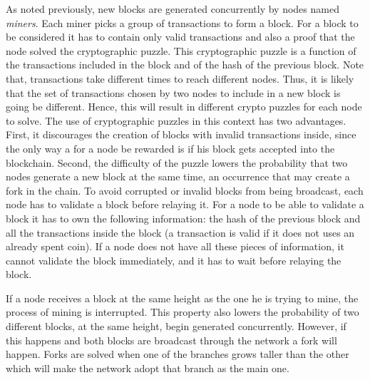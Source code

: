 \documentclass{dads}   %
\begin{document}
As noted previously, new blocks are generated concurrently by nodes named \textsl{miners}. Each miner picks a group of transactions to form a block. For a block to be considered it has to contain only valid transactions and also a proof that the node solved the cryptographic puzzle. This cryptographic puzzle is a function of the transactions included in the block and of the hash of the previous block. Note that, transactions take different times to reach different nodes. Thus, it is likely that the set of transactions chosen by two nodes to include in a new block is going be different. Hence, this will result in different crypto puzzles for each node to solve. The use of cryptographic puzzles in this context has two advantages. First, it discourages the creation of blocks with invalid transactions inside, since the only way a for a node be rewarded is if his block gets accepted into the blockchain. Second, the difficulty of the puzzle lowers the probability that two nodes generate a new block at the same time, an occurrence that may create a fork in the chain.  To avoid corrupted or invalid blocks from being broadcast, each node has to validate a block before relaying it. For a node to be able to validate a block it has to own the following information: the hash of the previous block and all the transactions inside the block (a transaction is valid if it does not uses an already spent coin).  If a node does not have all these pieces of information, it cannot validate the block immediately, and it has to wait before relaying the block.

If a node receives a block at the same height as the one he is trying to mine, the process of mining is interrupted. This property also lowers the probability of two different blocks, at the same height, begin generated concurrently. However, if this happens and both blocks are broadcast through the network a fork will happen. Forks are solved when one of the branches grows taller than the other which will make the network adopt that branch as the main one. 

\end{document}
